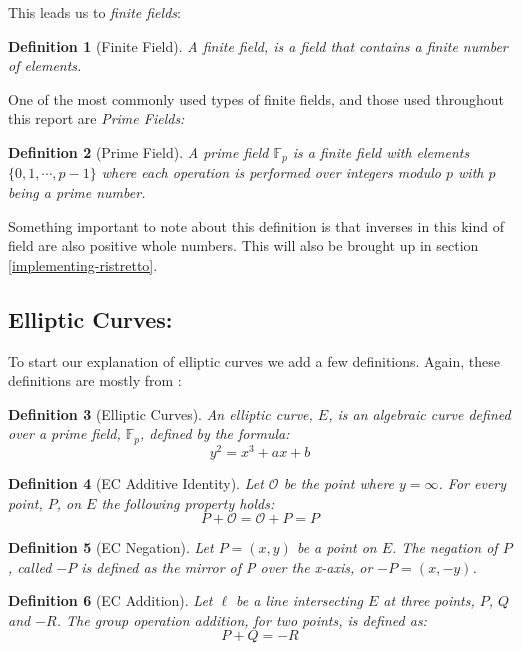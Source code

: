 \documentclass{article}
\newtheorem{definition}{Definition}[section]
\renewcommand{\O}{\mathcal{O}}
\newcommand{\F}{\mathbb{F}}
\begin{document}
\newpage

This leads us to \textit{finite fields}:

\begin{definition}[Finite Field]
	A finite field, is a field that contains a finite number of elements.
\end{definition}

One of the most commonly used types of finite fields, and those used
throughout this report are \textit{Prime Fields:} 

\begin{definition}[Prime Field]
	A prime field $\F_p$ is a finite field with elements $\{0, 1,
	\cdots, p-1\}$ where each operation is performed over integers
	modulo $p$ with $p$ being a prime number.
\end{definition}

Something important to note about this definition is that inverses in
this kind of field are also positive whole numbers. This will also be brought up in section \ref{implementing-ristretto}.

\subsection{Elliptic Curves:}\label{elliptic-curves}

To start our explanation of elliptic curves we add a few
definitions. Again, these definitions are mostly from
\cite{elliptic-curves}:

\begin{definition}[Elliptic Curves]
	An elliptic curve, $E$, is an algebraic curve defined over a
	prime field, $\F_p$, defined by the formula:
	$$y^2 = x^3 + ax + b$$
\end{definition}

\begin{definition}[EC Additive Identity]
	Let $\O$ be the point where $y = \infty$. For every point, $P$,
	on $E$ the following property holds:
	$$P + \O = \O + P = P$$
\end{definition}

\begin{definition}[EC Negation]
	Let $P = (x,y)$ be a point on $E$. The negation of $P$, called $-P$
	is defined as the mirror of P over the x-axis, or $-P = (x,-y)$.
\end{definition}

\begin{definition}[EC Addition]
	Let $\ell$ be a line intersecting $E$ at three points, $P$, $Q$ and
	$-R$. The group operation addition, for two points, is defined as:
	$$P + Q = {-R}$$
\end{definition}
\end{document}
